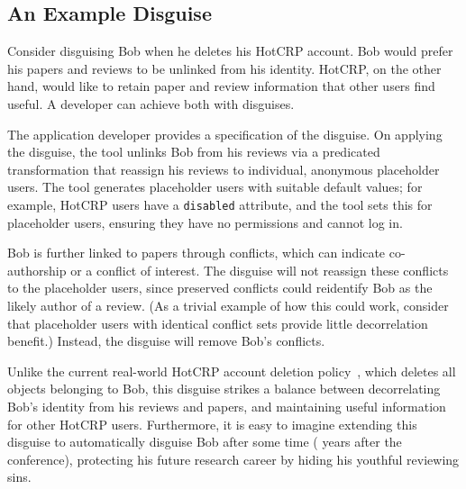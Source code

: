 \subsection{An Example Disguise}
\label{design:eg}
%
Consider disguising Bob when he deletes his HotCRP account.
%
Bob would prefer his papers and reviews to be unlinked from his identity.
%
HotCRP, on the other hand, would like to retain paper and review information that other users
find useful.
%
A developer can achieve both with disguises.
%

%
The application developer provides a specification of the disguise.
%
On applying the disguise, the tool unlinks Bob from his reviews via a
predicated transformation that reassign his reviews to individual, anonymous
placeholder users.
%
%
The tool generates placeholder users with suitable default values; for
example, HotCRP users have a \texttt{disabled} attribute, and the tool sets
this for placeholder users, ensuring they have no permissions and cannot log
in.
%

%
Bob is further linked to papers through conflicts, which can
indicate co-authorship or a conflict of interest.
%
The disguise will not reassign these conflicts to the placeholder users,
since preserved conflicts could reidentify Bob as the likely author of a
review.
%
(As a trivial example of how this could work, consider that placeholder
users with identical conflict sets provide little decorrelation benefit.)
%
Instead, the disguise will remove Bob's conflicts.
%

Unlike the current real-world HotCRP account deletion policy~\cite{hotcrp:privacy},
which deletes all objects belonging to Bob, this disguise strikes a balance between
decorrelating Bob's identity from his reviews and papers, and maintaining useful
information for other HotCRP users.
%
Furthermore, it is easy to imagine extending this disguise to automatically disguise
Bob after some time ( years after the conference), protecting his future
research career by hiding his youthful reviewing sins.
%

